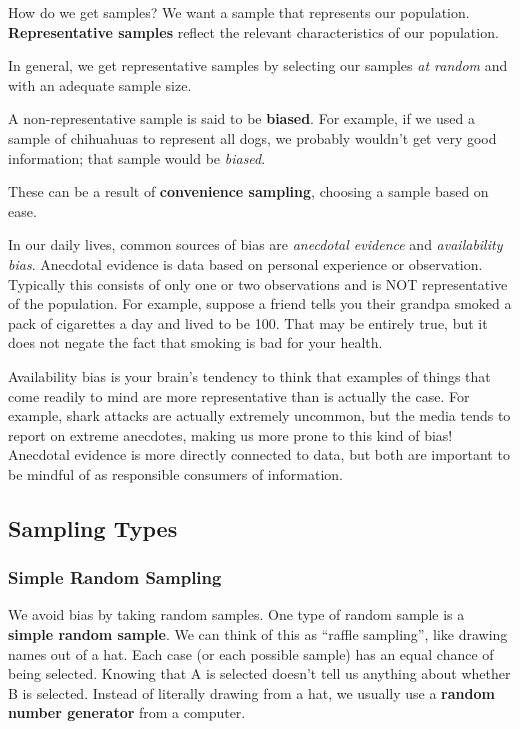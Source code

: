 \documentclass[
]{book}
\begin{document}
How do we get samples? We want a sample that represents our population. \textbf{Representative samples} reflect the relevant characteristics of our population.

In general, we get representative samples by selecting our samples \emph{at random} and with an adequate sample size.

A non-representative sample is said to be \textbf{biased}. For example, if we used a sample of chihuahuas to represent all dogs, we probably wouldn't get very good information; that sample would be \emph{biased}.

These can be a result of \textbf{convenience sampling}, choosing a sample based on ease.

In our daily lives, common sources of bias are \emph{anecdotal evidence} and \emph{availability bias}. Anecdotal evidence is data based on personal experience or observation. Typically this consists of only one or two observations and is NOT representative of the population. For example, suppose a friend tells you their grandpa smoked a pack of cigarettes a day and lived to be 100. That may be entirely true, but it does not negate the fact that smoking is bad for your health.

Availability bias is your brain's tendency to think that examples of things that come readily to mind are more representative than is actually the case. For example, shark attacks are actually extremely uncommon, but the media tends to report on extreme anecdotes, making us more prone to this kind of bias! Anecdotal evidence is more directly connected to data, but both are important to be mindful of as responsible consumers of information.

\subsection{Sampling Types}\label{sampling-types}

\subsubsection*{Simple Random Sampling}\label{simple-random-sampling}

We avoid bias by taking random samples. One type of random sample is a \textbf{simple random sample}. We can think of this as ``raffle sampling'', like drawing names out of a hat. Each case (or each possible sample) has an equal chance of being selected. Knowing that A is selected doesn't tell us anything about whether B is selected. Instead of literally drawing from a hat, we usually use a \textbf{random number generator} from a computer.
\end{document}
